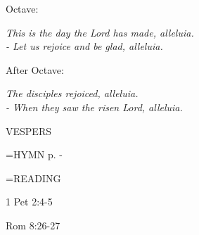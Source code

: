 \begin{center}
\end{center}Octave:\begin{center}\textit{	This is the day the Lord has made, alleluia.\\
- Let us rejoice and be glad, alleluia.}
\end{center}After Octave:\begin{center}\textit{	The disciples rejoiced, alleluia.\\
- When they saw the risen Lord, alleluia.}
\end{center}

\begin{flushleft}\normalsize VESPERS\\\end{flushleft}

\hangindent=\parindent \small{\uppercase{HYMN} p.  \pageref{easter:firstHymn} - \pageref{easter:lastHymn}\\}

\hangindent=\parindent \small READING
\begin{description}[labelindent=\parindent, leftmargin=*]
\item [1st-6th Week:]     1 Pet 2:4-5 \textbf{    }
\item [7th Week:]     Rom 8:26-27 \textbf{    }
\end{description}
